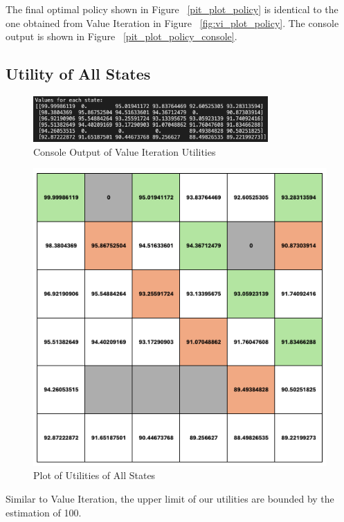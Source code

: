 \noindent The final optimal policy shown in Figure ~\ref{pit_plot_policy} is identical to the one obtained from Value Iteration in Figure ~\ref{fig:vi_plot_policy}. The console output is shown in Figure ~\ref{pit_plot_policy_console}.

\subsection{Utility of All States}
\begin{figure}[H]
    \centering
    \includegraphics[width=0.8\textwidth]{images/pi_utility.png}
    \caption{Console Output of Value Iteration Utilities}
    \label{fig:pi_console_utility}
\end{figure}

\begin{figure}[H]
    \centering
    \includegraphics[width=1.0\textwidth]{images/pi_plot_utility.png}
    \caption{Plot of Utilities of All States}
    \label{fig:pi_plot_utility}
\end{figure}

Similar to Value Iteration, the upper limit of our utilities are bounded by the estimation of 100.

